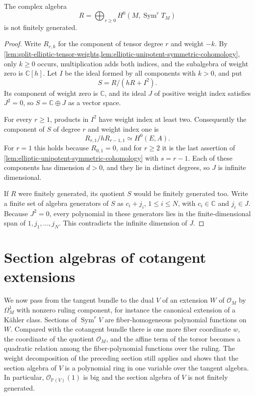 \begin{theorem}\label{thm:split-elliptic-tangent-ring-nonfinite}
The complex algebra
\[
 R=\bigoplus_{r\geq0}H^0(M,\operatorname{Sym}^rT_M)
\]
is not finitely generated.
\end{theorem}
\begin{proof}
Write $R_{r,k}$ for the component of tensor degree $r$ and weight $-k$. By \cref{lem:split-elliptic-tensor-weights,lem:elliptic-unipotent-symmetric-cohomology}, only $k\geq0$ occurs, multiplication adds both indices, and the subalgebra of weight zero is $\mathbb C[h]$. Let $I$ be the ideal formed by all components with $k>0$, and put
\[
 S=R/(hR+I^2).
\]
Its component of weight zero is $\mathbb C$, and its ideal $J$ of positive weight index satisfies $J^2=0$, so $S=\mathbb C\oplus J$ as a vector space.

For every $r\geq1$, products in $I^2$ have weight index at least two. Consequently the component of $S$ of degree $r$ and weight index one is
\[
 R_{r,1}/hR_{r-1,1}\simeq H^0(E,A).
\]
For $r=1$ this holds because $R_{0,1}=0$, and for $r\geq2$ it is the last assertion of \cref{lem:elliptic-unipotent-symmetric-cohomology} with $s=r-1$. Each of these components has dimension $d>0$, and they lie in distinct degrees, so $J$ is infinite dimensional.

If $R$ were finitely generated, its quotient $S$ would be finitely generated too. Write a finite set of algebra generators of $S$ as $c_i+j_i$, $1\leq i\leq N$, with $c_i\in\mathbb C$ and $j_i\in J$. Because $J^2=0$, every polynomial in these generators lies in the finite-dimensional span of $1,j_1,\ldots,j_N$. This contradicts the infinite dimension of $J$.
\end{proof}

\section{Section algebras of cotangent extensions}
\label{subsec:elliptic-cotangent-extension-algebra}

We now pass from the tangent bundle to the dual $V$ of an extension $W$ of $\mathcal O_M$ by $\Omega^1_M$ with nonzero ruling component, for instance the canonical extension of a K\"ahler class. Sections of $\operatorname{Sym}^rV$ are fiber-homogeneous polynomial functions on $W$. Compared with the cotangent bundle there is one more fiber coordinate $w$, the coordinate of the quotient $\mathcal O_M$, and the affine term of the torsor becomes a quadratic relation among the fiber-polynomial functions over the ruling. The weight decomposition of the preceding section still applies and shows that the section algebra of $V$ is a polynomial ring in one variable over the tangent algebra. In particular, $\mathcal O_{\mathbb P(V)}(1)$ is big and the section algebra of $V$ is not finitely generated.

